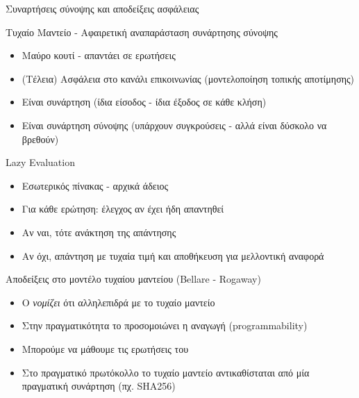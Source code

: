 \documentclass{beamer}
\begin{document}
\begin{frame}[allowframebreaks]{Συναρτήσεις σύνοψης και αποδείξεις ασφάλειας}

\begin{block}{Τυχαίο Μαντείο - Αφαιρετική αναπαράσταση συνάρτησης σύνοψης}
\begin{itemize}
\item Μαύρο κουτί - απαντάει σε ερωτήσεις
\item (Τέλεια) Ασφάλεια στο κανάλι επικοινωνίας (μοντελοποίηση τοπικής αποτίμησης)
\item Είναι συνάρτηση (ίδια είσοδος - ίδια έξοδος σε κάθε κλήση)
\item Είναι συνάρτηση σύνοψης (υπάρχουν συγκρούσεις - αλλά είναι δύσκολο να βρεθούν)
\end{itemize}
\end{block}

\framebreak

\begin{block}{Lazy Evaluation}
\begin{itemize}
\item Εσωτερικός πίνακας - αρχικά άδειος
\item Για κάθε ερώτηση: έλεγχος αν έχει ήδη απαντηθεί
\item Αν ναι, τότε ανάκτηση της απάντησης
\item Αν όχι, απάντηση με τυχαία τιμή και αποθήκευση για μελλοντική αναφορά
\end{itemize}
\end{block}
\framebreak

Αποδείξεις στο μοντέλο τυχαίου μαντείου (Bellare - Rogaway)
\begin{itemize}
\item Ο \adv \emph{νομίζει} ότι αλληλεπιδρά με το τυχαίο μαντείο
\item Στην πραγματικότητα το προσομοιώνει η αναγωγή (programmability)
\item Μπορούμε να μάθουμε τις ερωτήσεις του \adv
\item Στο πραγματικό πρωτόκολλο το τυχαίο μαντείο αντικαθίσταται από μία πραγματική συνάρτηση (πχ. SHA256)
\end{itemize}

\framebreak

\end{frame}
\end{document}
